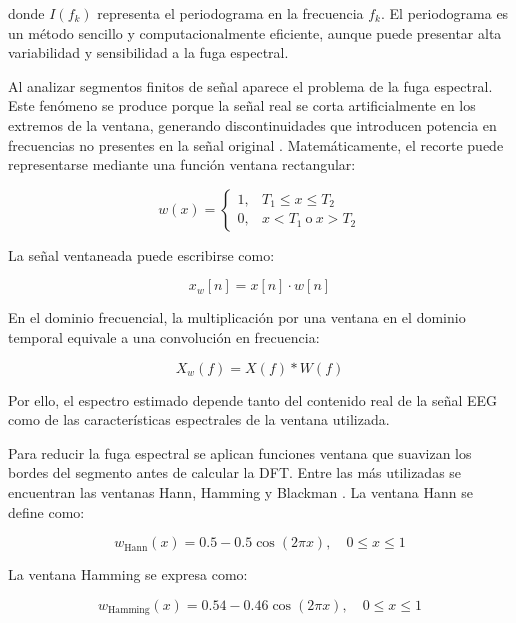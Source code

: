 \documentclass[../main.tex]{subfiles}
\begin{document}
donde \(I(f_k)\) representa el periodograma en la frecuencia \(f_k\). El periodograma es un método sencillo y computacionalmente eficiente, aunque puede presentar alta variabilidad y sensibilidad a la fuga espectral.

Al analizar segmentos finitos de señal aparece el problema de la fuga espectral. Este fenómeno se produce porque la señal real se corta artificialmente en los extremos de la ventana, generando discontinuidades que introducen potencia en frecuencias no presentes en la señal original \cite{Sawa2022}. Matemáticamente, el recorte puede representarse mediante una función ventana rectangular:

\begin{equation}
    w(x)=
    \begin{cases}
    1, & T_1 \leq x \leq T_2 \\
    0, & x < T_1 \ \text{o} \ x > T_2
    \end{cases}
    \label{eq:rectangular_window}
\end{equation}

La señal ventaneada puede escribirse como:

\begin{equation}
    x_w[n] = x[n] \cdot w[n]
    \label{eq:windowed_signal}
\end{equation}

En el dominio frecuencial, la multiplicación por una ventana en el dominio temporal equivale a una convolución en frecuencia:

\begin{equation}
    X_w(f) = X(f) * W(f)
    \label{eq:frequency_convolution}
\end{equation}

Por ello, el espectro estimado depende tanto del contenido real de la señal EEG como de las características espectrales de la ventana utilizada.

Para reducir la fuga espectral se aplican funciones ventana que suavizan los bordes del segmento antes de calcular la DFT. Entre las más utilizadas se encuentran las ventanas Hann, Hamming y Blackman \cite{Sawa2022}. La ventana Hann se define como:

\begin{equation}
    w_{\text{Hann}}(x)
    =
    0.5 - 0.5\cos(2\pi x),
    \quad 0 \leq x \leq 1
    \label{eq:hann}
\end{equation}

La ventana Hamming se expresa como:

\begin{equation}
    w_{\text{Hamming}}(x)
    =
    0.54 - 0.46\cos(2\pi x),
    \quad 0 \leq x \leq 1
    \label{eq:hamming}
\end{equation}
\end{document}
